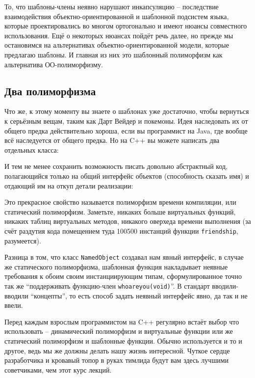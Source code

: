 \documentclass[a4paper,12pt,oneside]{article}
\begin{document}
То, что шаблоны-члены неявно нарушают инкапсуляцию -- последствие взаимодействия объектно-ориентированной и шаблонной подсистем языка, которые проектировались во многом ортогонально и имеют нюансы совместного использования. Ещё о некоторых нюансах пойдёт речь далее, но прежде мы остановимся на альтернативах объектно-ориентированной модели, которые предлагаю шаблоны. И главная из них это шаблонный полиморфизм как альтернатива ОО-полиморфизму.

\subsection{Два полиморфизма}

Что же, к этому моменту вы знаете о шаблонах уже достаточно, чтобы вернуться к серьёзным вещам, таким как Дарт Вейдер и покемоны. Идея наследовать их от общего предка действительно хороша, если вы программист на Java, где вообще всё наследуется от общего предка. Но на C++ вы можете написать два отдельных класса:



И тем не менее сохранить возможность писать довольно абстрактный код, полагающийся только на общий интерфейс объектов (способность сказать имя) и отдающий им на откуп детали реализации:



Это прекрасное свойство называется полиморфизм времени компиляции, или статический полиморфизм. Заметьте, никаких больше виртуальных функций, никаких таблиц виртуальных методов, никакого оверхеда времени выполнения (за счёт раздутия кода помещением туда 100500 инстанций функции \lstinline!friendship!, разумеется).

Разница в том, что класс \lstinline!NamedObject! создавал нам явный интерфейс, в случае же статического полиморфизма, шаблонная функция накладывает неявные требования к обоим своим инстанциирующим типам, сформулированное точно так же ``поддерживать функцию-член \lstinline!whoareyou(void)!''. В стандарт вводили-вводили ``концепты'', то есть способ задать неявный интерфейс явно, да так и не ввели. 

Перед каждым взрослым программистом на C++ регулярно встаёт выбор что использовать – динамический полиморфизм и виртуальные функции или же статический полиморфизм и шаблонные функции. Обычно используется и то и другое, ведь мы же должны делать нашу жизнь интересной. Чуткое сердце разработчика и кровавый топор в руках тимлида будут вам здесь лучшими советчиками, чем этот курс лекций.
\end{document}
